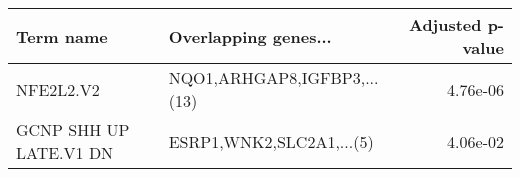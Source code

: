 \begin{tabular}{llr}
\toprule
             Term name &        Overlapping genes... &  Adjusted p-value \\
\midrule
             NFE2L2.V2 & NQO1,ARHGAP8,IGFBP3,...(13) &          4.76e-06 \\
GCNP SHH UP LATE.V1 DN &    ESRP1,WNK2,SLC2A1,...(5) &          4.06e-02 \\
\bottomrule
\end{tabular}
